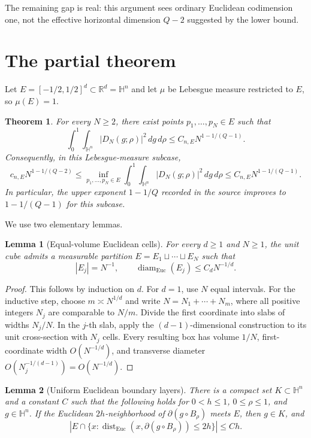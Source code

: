 \documentclass[11pt]{article}
\newtheorem{theorem}{Theorem}
\newtheorem{lemma}{Lemma}
\newcommand{\HH}{\mathbb H}
\newcommand{\RR}{\mathbb R}
\begin{document}
The remaining gap is real: this argument sees ordinary Euclidean codimension
one, not the effective horizontal dimension \(Q-2\) suggested by the lower
bound.

\section{The partial theorem}

Let \(E=[-1/2,1/2]^d\subset\RR^d=\HH^n\) and let \(\mu\) be Lebesgue
measure restricted to \(E\), so \(\mu(E)=1\).

\begin{theorem}\label{thm:main}
For every \(N\geq2\), there exist points \(p_1,\ldots,p_N\in E\) such that
\[
 \int_0^1\int_{\HH^n}|D_N(g;\rho)|^2\,dg\,d\rho
 \leq C_{n,E}N^{1-1/(Q-1)}.
\]
Consequently, in this Lebesgue-measure subcase,
\[
 c_{n,E}N^{1-1/(Q-2)}
 \leq
 \inf_{p_1,\ldots,p_N\in E}
 \int_0^1\int_{\HH^n}|D_N(g;\rho)|^2\,dg\,d\rho
 \leq
 C_{n,E}N^{1-1/(Q-1)}.
\]
In particular, the upper exponent \(1-1/Q\) recorded in the source improves
to \(1-1/(Q-1)\) for this subcase.
\end{theorem}

We use two elementary lemmas.

\begin{lemma}[Equal-volume Euclidean cells]\label{lem:partition}
For every \(d\geq1\) and \(N\geq1\), the unit cube admits a measurable
partition \(E=E_1\sqcup\cdots\sqcup E_N\) such that
\[
 |E_j|=N^{-1},\qquad
 \operatorname{diam}_{\mathrm{Euc}}(E_j)\leq C_dN^{-1/d}.
\]
\end{lemma}

\begin{proof}
This follows by induction on \(d\).  For \(d=1\), use \(N\) equal intervals.
For the inductive step, choose \(m\asymp N^{1/d}\) and write
\(N=N_1+\cdots+N_m\), where all positive integers \(N_j\) are comparable to
\(N/m\).  Divide the first coordinate into slabs of widths \(N_j/N\).  In
the \(j\)-th slab, apply the \((d-1)\)-dimensional construction to its unit
cross-section with \(N_j\) cells.  Every resulting box has volume \(1/N\),
first-coordinate width \(O(N^{-1/d})\), and transverse diameter
\(O(N_j^{-1/(d-1)})=O(N^{-1/d})\).
\end{proof}

\begin{lemma}[Uniform Euclidean boundary layers]\label{lem:layer}
There is a compact set \(K\subset\HH^n\) and a constant \(C\) such that the
following holds for \(0<h\leq1\), \(0\leq\rho\leq1\), and \(g\in\HH^n\).
If the Euclidean \(2h\)-neighborhood of
\(\partial(g\circ B_\rho)\) meets \(E\), then \(g\in K\), and
\[
 \left|E\cap\{x:\operatorname{dist}_{\mathrm{Euc}}
       (x,\partial(g\circ B_\rho))\leq2h\}\right|\leq Ch.
\]
\end{lemma}
\end{document}

